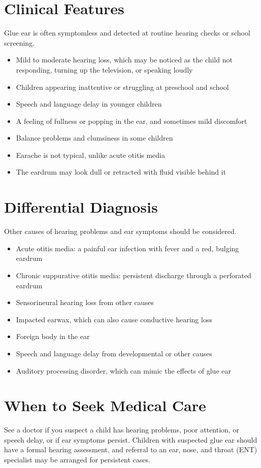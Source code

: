 \section*{Clinical Features}
Glue ear is often symptomless and detected at routine hearing checks or school screening.

\begin{itemize}
    \item Mild to moderate hearing loss, which may be noticed as the child not responding, turning up the television, or speaking loudly
    \item Children appearing inattentive or struggling at preschool and school
    \item Speech and language delay in younger children
    \item A feeling of fullness or popping in the ear, and sometimes mild discomfort
    \item Balance problems and clumsiness in some children
    \item Earache is not typical, unlike acute otitis media
    \item The eardrum may look dull or retracted with fluid visible behind it
\end{itemize}

\section*{Differential Diagnosis}
Other causes of hearing problems and ear symptoms should be considered.

\begin{itemize}
    \item Acute otitis media: a painful ear infection with fever and a red, bulging eardrum
    \item Chronic suppurative otitis media: persistent discharge through a perforated eardrum
    \item Sensorineural hearing loss from other causes
    \item Impacted earwax, which can also cause conductive hearing loss
    \item Foreign body in the ear
    \item Speech and language delay from developmental or other causes
    \item Auditory processing disorder, which can mimic the effects of glue ear
\end{itemize}

\section*{When to Seek Medical Care}
See a doctor if you suspect a child has hearing problems, poor attention, or speech delay, or if ear symptoms persist. Children with suspected glue ear should have a formal hearing assessment, and referral to an ear, nose, and throat (ENT) specialist may be arranged for persistent cases.

